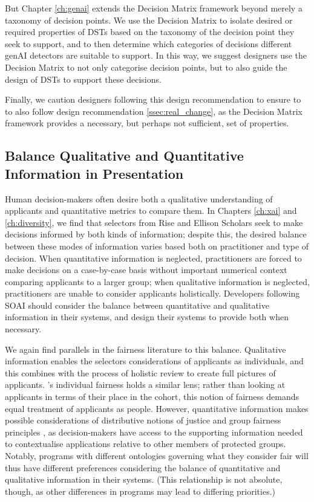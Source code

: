 But Chapter \ref{ch:genai} extends the Decision Matrix framework beyond merely a taxonomy of decision points. We use the Decision Matrix to isolate desired or required properties of DSTs based on the taxonomy of the decision point they seek to support, and to then determine which categories of decisions different genAI detectors are suitable to support. In this way, we suggest designers use the Decision Matrix to not only categorise decision points, but to also guide the design of DSTs to support these decisions.

Finally, we caution designers following this design recommendation to ensure to to also follow design recommendation \ref{ssec:real_change}, as the Decision Matrix framework provides a necessary, but perhaps not sufficient, set of properties.

\subsection{Balance Qualitative and Quantitative Information in Presentation}
Human decision-makers often desire both a qualitative understanding of applicants and quantitative metrics to compare them. In Chapters \ref{ch:xai} and \ref{ch:diversity}, we find that selectors from Rise and Ellison Scholars seek to make decisions informed by both kinds of information; despite this, the desired balance between these modes of information varies based both on practitioner and type of decision. When quantitative information is neglected, practitioners are forced to make decisions on a case-by-case basis without important numerical context comparing applicants to a larger group; when qualitative information is neglected, practitioners are unable to consider applicants holistically. Developers following SOAI should consider the balance between quantitative and qualitative information in their systems, and design their systems to provide both when necessary.

We again find parallels in the fairness literature to this balance. Qualitative information enables the selectors considerations of applicants as individuals, and this combines with the process of holistic review to create full pictures of applicants. \cite{dwork_fairness_2012}'s individual fairness holds a similar lens; rather than looking at applicants in terms of their place in the cohort, this notion of fairness demands equal treatment of applicants as people. However, quantitative information makes possible considerations of distributive notions of justice and group fairness principles \cite{Olsaretti_2018}, as decision-makers have access to the supporting information needed to contextualise applications relative to other members of protected groups. Notably, programs with different ontologies governing what they consider fair will thus have different preferences considering the balance of quantitative and qualitative information in their systems. (This relationship is not absolute, though, as other differences in programs may lead to differing priorities.)

